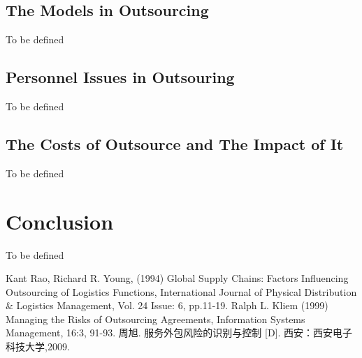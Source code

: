 \documentclass[twocolumn,UTF8]{article}
\begin{document}
\subsection{The Models in Outsourcing}
To be defined

\subsection{Personnel Issues in Outsouring}
To be defined

\subsection{The Costs of Outsource and The Impact of It}
To be defined



\section{Conclusion}
To be defined




\begin{thebibliography}{99} %

\bibitem[1]{} Kant Rao, Richard R. Young, (1994) Global Supply Chains: Factors Influencing Outsourcing of Logistics
Functions, International Journal of Physical Distribution \& Logistics Management, Vol. 24 Issue: 6, pp.11-19.
\bibitem[2]{} Ralph L. Kliem (1999) Managing the Risks of Outsourcing Agreements, Information Systems Management, 16:3, 91-93.
\bibitem[3]{} 周旭. 服务外包风险的识别与控制 [D]. 西安：西安电子科技大学,2009.

\end{thebibliography}

\end{document}
